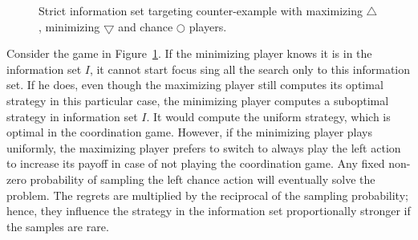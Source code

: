 \documentclass[letterpaper]{article}
\newcommand{\tth}{\mathtt{h}}
\newcounter{vlNoteCounter}
\newcommand{\vlnote}[1]{{\scriptsize \color{blue} $\blacksquare$ \refstepcounter{vlNoteCounter}\textsf{[VL]$_{\arabic{vlNoteCounter}}$:{#1}}}}
\begin{document}
\begin{figure}
\begin{center}
\end{center}
\caption{Strict information set targeting counter-example with maximizing $\bigtriangleup$, minimizing $\bigtriangledown$ and chance $\bigcirc$ players.}\label{fig:coordGame}
\end{figure}

Consider the game in Figure~\ref{fig:coordGame}. If the minimizing player knows it is in the information set $I$, it cannot start focus sing all the search only to this information set. If he does, even though the maximizing player still computes its optimal strategy in this particular case, the minimizing player computes a suboptimal strategy in information set $I$. It would compute the uniform strategy, which is optimal in the coordination game. However, if the minimizing player plays uniformly, the maximizing player prefers to switch to always play the left action to increase its payoff in case of not playing the coordination game. Any fixed non-zero probability of sampling the left chance action will eventually solve the problem. The regrets are multiplied by the reciprocal of the sampling probability; hence, they influence the strategy in the information set proportionally stronger if the samples are rare. 

\end{document}
